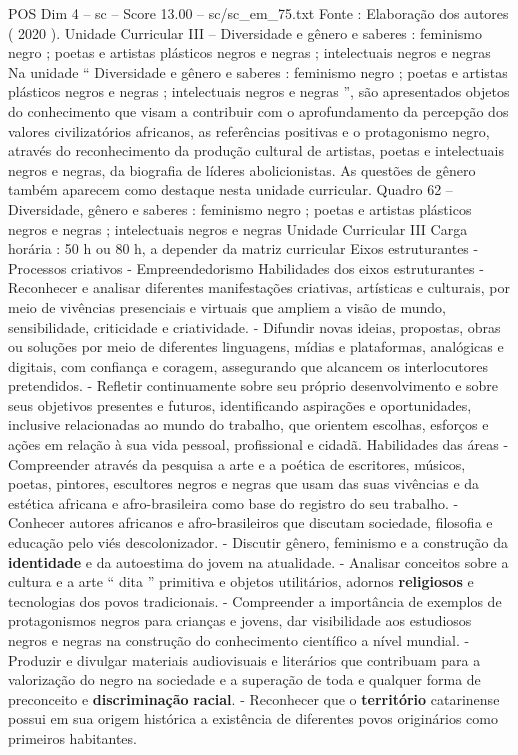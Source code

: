 \begin{textsample}{POS Dim 4 – sc – Score 13.00 – sc/sc\_em\_75.txt}
Fonte : Elaboração dos autores ( 2020 ).
Unidade Curricular III – Diversidade e gênero e saberes : feminismo negro ; poetas e artistas plásticos negros e negras ; intelectuais negros e negras Na unidade “ Diversidade e gênero e saberes : feminismo negro ; poetas e artistas plásticos negros e negras ; intelectuais negros e negras ”, são apresentados objetos do conhecimento que visam a contribuir com o aprofundamento da percepção dos valores civilizatórios africanos, as referências positivas e o protagonismo negro, através do reconhecimento da produção cultural de artistas, poetas e intelectuais negros e negras, da biografia de líderes abolicionistas.
As questões de gênero também aparecem como destaque nesta unidade curricular.
Quadro 62 – Diversidade, gênero e saberes : feminismo negro ; poetas e artistas plásticos negros e negras ; intelectuais negros e negras Unidade Curricular III Carga horária : 50 h ou 80 h, a depender da matriz curricular Eixos estruturantes - Processos criativos - Empreendedorismo Habilidades dos eixos estruturantes - Reconhecer e analisar diferentes manifestações criativas, artísticas e culturais, por meio de vivências presenciais e virtuais que ampliem a visão de mundo, sensibilidade, criticidade e criatividade. - Difundir novas ideias, propostas, obras ou soluções por meio de diferentes linguagens, mídias e plataformas, analógicas e digitais, com confiança e coragem, assegurando que alcancem os interlocutores pretendidos. - Refletir continuamente sobre seu próprio desenvolvimento e sobre seus objetivos presentes e futuros, identificando aspirações e oportunidades, inclusive relacionadas ao mundo do trabalho, que orientem escolhas, esforços e ações em relação à sua vida pessoal, profissional e cidadã.
Habilidades das áreas - Compreender através da pesquisa a arte e a poética de escritores, músicos, poetas, pintores, escultores negros e negras que usam das suas vivências e da estética africana e afro-brasileira como base do registro do seu trabalho. - Conhecer autores africanos e afro-brasileiros que discutam sociedade, filosofia e educação pelo viés descolonizador. - Discutir gênero, feminismo e a construção da \textbf{identidade} e da autoestima do jovem na atualidade. - Analisar conceitos sobre a cultura e a arte “ dita ” primitiva e objetos utilitários, adornos \textbf{religiosos} e tecnologias dos povos tradicionais. - Compreender a importância de exemplos de protagonismos negros para crianças e jovens, dar visibilidade aos estudiosos negros e negras na construção do conhecimento científico a nível mundial. - Produzir e divulgar materiais audiovisuais e literários que contribuam para a valorização do negro na sociedade e a superação de toda e qualquer forma de preconceito e \textbf{discriminação} \textbf{racial}. - Reconhecer que o \textbf{território} catarinense possui em sua origem histórica a existência de diferentes povos originários como primeiros habitantes.

\end{textsample}
